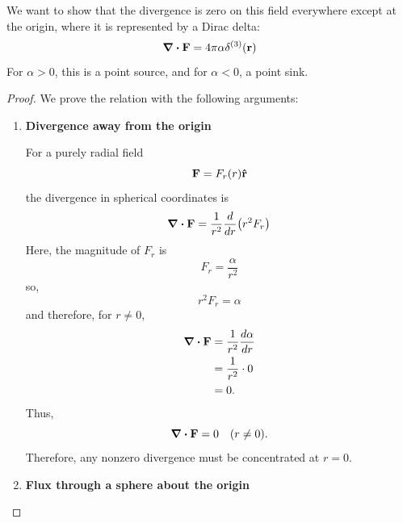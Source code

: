 		We want to show that the divergence is zero on this field everywhere except
		at the origin, where it is represented by a Dirac delta:
		\begin{equation}
			\div\vb{F} = 4\pi\alpha\delta^{(3)}(\vb{r})
		\end{equation}
		For $\alpha>0$, this is a point source, and for $\alpha<0$, a point sink.
		\begin{proof}

			We prove the relation with the following arguments:
			\begin{enumerate}
				\item \textbf{Divergence away from the origin}
					  
					  For a purely radial field 
					  \begin{equation}
						  \vb{F} = F_r(r)\vu{r}
					  \end{equation}
					  the divergence in spherical coordinates is
					  \begin{equation}
						  \div\vb{F} = \frac{1}{r^2}\dv{}{r}\qty(r^2 F_r) 
					  \end{equation}
					  Here, the magnitude of $F_r$ is
					  \begin{equation}
						  F_r = \frac{\alpha}{r^2} 
					  \end{equation}
					  so,
					  \begin{equation}
						  r^2 F_r = \alpha
					  \end{equation}
					  and therefore, for $r\neq 0$, 
					  \begin{align}
						  \div\vb{F} &= \frac{1}{r^2} \dv{\alpha}{r}\\
									 &= \frac{1}{r^2} \cdot 0\\ 
									 &= 0.
					  \end{align}
					  Thus,
					  \begin{equation}
						  \div\vb{F} = 0\quad(r\neq 0).
					  \end{equation}
					Therefore, any nonzero divergence must be concentrated at $r=0$.
				\item \textbf{Flux through a sphere about the origin}


\end{enumerate}
\end{proof}
